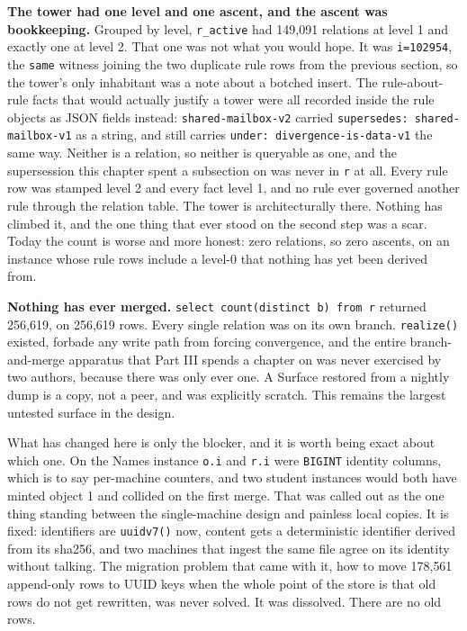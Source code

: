 \textbf{The tower had one level and one ascent, and the ascent was bookkeeping.} Grouped by level, \texttt{r\_active} had 149{,}091 relations at level 1 and exactly one at level 2. That one was not what you would hope. It was \texttt{i=102954}, the \texttt{same} witness joining the two duplicate rule rows from the previous section, so the tower's only inhabitant was a note about a botched insert. The rule-about-rule facts that would actually justify a tower were all recorded inside the rule objects as JSON fields instead: \texttt{shared-mailbox-v2} carried \texttt{supersedes: shared-mailbox-v1} as a string, and  still carries \texttt{under: divergence-is-data-v1} the same way. Neither is a relation, so neither is queryable as one, and the supersession this chapter spent a subsection on was never in \texttt{r} at all. Every rule row was stamped level 2 and every fact level 1, and no rule ever governed another rule through the relation table. The tower is architecturally there. Nothing has climbed it, and the one thing that ever stood on the second step was a scar. Today the count is worse and more honest: zero relations, so zero ascents, on an instance whose rule rows include a level-0 that nothing has yet been derived from.

\textbf{Nothing has ever merged.} \texttt{select count(distinct b) from r} returned 256{,}619, on 256{,}619 rows. Every single relation was on its own branch. \texttt{realize()} existed,  forbade any write path from forcing convergence, and the entire branch-and-merge apparatus that Part III spends a chapter on was never exercised by two authors, because there was only ever one. A Surface restored from a nightly dump is a copy, not a peer, and was explicitly scratch. This remains the largest untested surface in the design.

What has changed here is only the blocker, and it is worth being exact about which one. On the Names instance \texttt{o.i} and \texttt{r.i} were \texttt{BIGINT} identity columns, which is to say per-machine counters, and two student instances would both have minted object 1 and collided on the first merge. That was called out as the one thing standing between the single-machine design and painless local copies. It is fixed: identifiers are \texttt{uuidv7()} now, content gets a deterministic identifier derived from its sha256, and two machines that ingest the same file agree on its identity without talking. The migration problem that came with it, how to move 178{,}561 append-only rows to UUID keys when the whole point of the store is that old rows do not get rewritten, was never solved. It was dissolved. There are no old rows.

